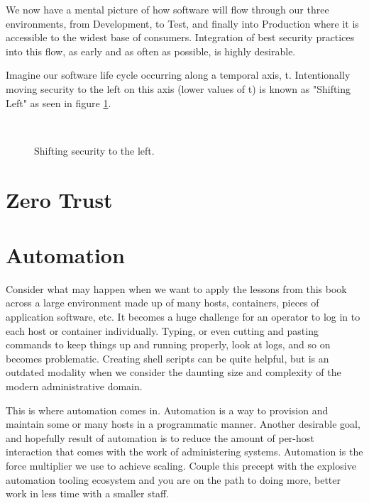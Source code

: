 \justify
We now have a mental picture of how software will flow through our
three environments, from Development, to Test, and finally into Production
where it is accessible to the widest base of consumers. Integration of 
best security practices into this flow, as early and as often as possible, 
is highly desirable. 

\justify
Imagine our software life cycle occurring along a temporal 
axis, t. Intentionally moving security to the left on this axis (lower 
values of t) is known as "Shifting Left" as seen in 
figure \ref{fig:shift}.

\justify
\begin{figure}[!htb]
	\centering
	\\
	\caption{Shifting security to the left.}
	\label{fig:shift}
\end{figure}

\justify


\section{Zero Trust}

\section{Automation}

\justify
Consider what may happen when we want to apply the lessons from this book across a large environment made up of many hosts, containers, pieces of application software, etc. It becomes a huge challenge for an operator to log in to each host or container individually. Typing, or even cutting and pasting commands to keep things up and running properly, look at logs, and so on becomes problematic. Creating shell scripts can be quite helpful, but is an outdated modality when we consider the daunting size and complexity of the modern administrative domain.

\justify
This is where automation comes in. Automation is a way to provision and maintain some or many hosts in a programmatic manner. Another desirable goal, and hopefully result of automation is to reduce the amount of per-host interaction that comes with the work of administering systems. Automation is the force multiplier we use to achieve scaling. Couple this precept with the explosive automation tooling ecosystem and you are on the path to doing more, better work in less time with a smaller staff. 

